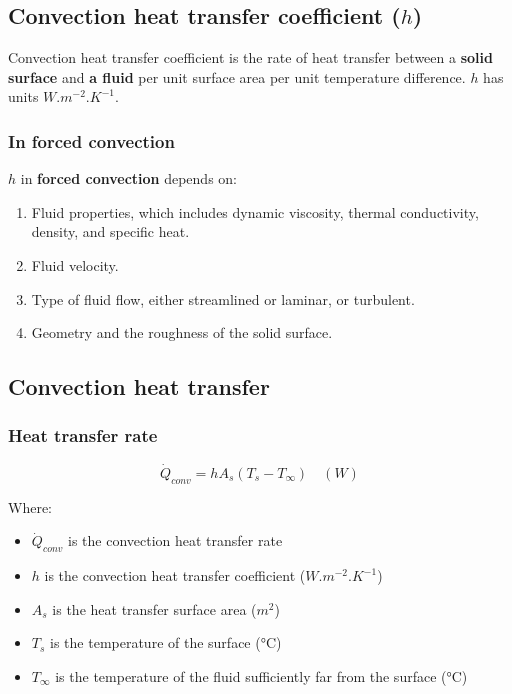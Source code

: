 \documentclass[11pt]{article}
\begin{document}
\subsection{Convection heat transfer coefficient (\(h\))}
\label{sec:orgaeed622}
Convection heat transfer coefficient is the rate of heat transfer between a \textbf{solid surface} and \textbf{a fluid} per unit surface area per unit temperature difference. \(h\) has units \(\unit{W.m^{-2}.K^{-1}}\).

\subsubsection{In forced convection}
\label{sec:org5a2b922}
\(h\) in \textbf{forced convection} depends on:
\begin{enumerate}
\item Fluid properties, which includes dynamic viscosity, thermal conductivity, density, and specific heat.
\item Fluid velocity.
\item Type of fluid flow, either streamlined or laminar, or turbulent.
\item Geometry and the roughness of the solid surface.
\end{enumerate}

\subsection{Convection heat transfer}
\label{sec:org8eb3024}

\subsubsection{Heat transfer rate}
\label{sec:org5be603f}
\[\dot{Q}_{conv} = h A_s (T_s - T_{\infty}) \quad (\unit{W})\]

Where:
\begin{itemize}
\item \(\dot{Q}_{conv}\) is the convection heat transfer rate
\item \(h\) is the convection heat transfer coefficient (\(\unit{W.m^{-2}.K^{-1}}\))
\item \(A_s\) is the heat transfer surface area (\(\unit{m^{2}}\))
\item \(T_s\) is the temperature of the surface (\(\unit{\degreeCelsius}\))
\item \(T_{\infty}\) is the temperature of the fluid sufficiently far from the surface (\(\unit{\degreeCelsius}\))
\end{itemize}
\end{document}
